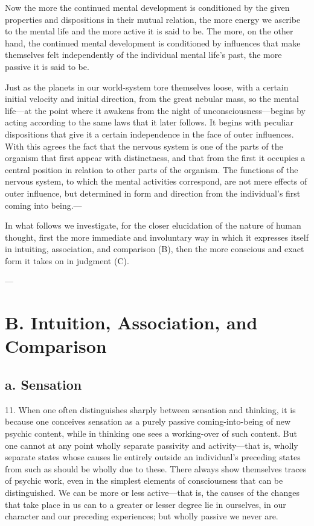 \documentclass[12pt,a4paper]{book}
\newcommand{\opage}[1]{\marginnote{\footnotesize\textit{[#1]}}}
\begin{document}
Now the more the continued mental development is conditioned by the given
properties and dispositions in their mutual relation, the more energy we
ascribe to the mental life and the more active it is said to be. The
more, on the other hand, the continued mental development is conditioned
by influences that make themselves felt independently of the individual
mental life's past, the more passive it is said to be.

Just as the planets in our world-system tore themselves loose, with a
certain initial velocity and initial direction, from the great nebular
mass, so the mental life---at the point where it awakens from the night
of unconsciousness---begins by acting according to the same laws that it
later follows. It begins with peculiar dispositions that give it a
certain independence in the face of outer influences. With this agrees
the fact that the nervous system is one of the parts of the organism
that first appear with distinctness, and that from the first it occupies
a central position in relation to other parts of the organism. The
functions of the nervous system, to which the mental activities
correspond, are not mere effects \opage{37}of outer influence, but determined in
form and direction from the individual's first coming into being.---

In what follows we investigate, for the closer elucidation of the nature
of human thought, first the more immediate and involuntary way in which
it expresses itself in intuiting, association, and comparison (B), then
the more conscious and exact form it takes on in judgment (C).

\begin{center}---\end{center}

\section*{B. Intuition, Association, and Comparison}
\label{sec:anskuen}

\subsection*{a. Sensation}
\label{ssec:sansning}

11. When one often distinguishes sharply between sensation and thinking,
it is because one conceives sensation as a purely passive coming-into-being
of new psychic content, while in thinking one sees a working-over of
such content. But one cannot at any point wholly separate passivity and
activity---that is, wholly separate states whose causes lie entirely
outside an individual's preceding states from such as should be wholly
due to these. There always show themselves traces of psychic work, even
in the simplest elements of consciousness that can be distinguished. We
can be more or less active---that is, the causes of the changes that take
place in us can to a greater or lesser degree lie in ourselves, in our
character and our preceding experiences; but wholly passive we never are.
\end{document}
